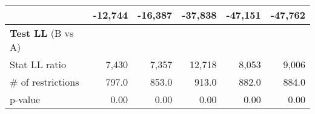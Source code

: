 \begin{tabular}{l|ccccc}
\multicolumn{1}{l}{\hspace{1em}{Model (B)}} &
  \multicolumn{1}{|r}{-12,744} &
  \multicolumn{1}{r}{-16,387} &
  \multicolumn{1}{r}{-37,838} &
  \multicolumn{1}{r}{-47,151} &
  \multicolumn{1}{r}{-47,762} \\ \hline
\multicolumn{1}{l}{\textbf{Test LL} (B vs A)} \\  \hline
\multicolumn{1}{l}{\hspace{1em}Stat LL ratio } &
  \multicolumn{1}{|r}{7,430} &
  \multicolumn{1}{r}{7,357} &
  \multicolumn{1}{r}{12,718} &
  \multicolumn{1}{r}{8,053} &
  \multicolumn{1}{r}{9,006} \\
\multicolumn{1}{l}{\hspace{1em}$\#$ of restrictions } &
  \multicolumn{1}{|r}{797.0} &
  \multicolumn{1}{r}{853.0} &
  \multicolumn{1}{r}{913.0} &
  \multicolumn{1}{r}{882.0} &
  \multicolumn{1}{r}{884.0} \\
\multicolumn{1}{l}{\hspace{1em}p-value } &
  \multicolumn{1}{|r}{0.00} &
  \multicolumn{1}{r}{0.00} &
  \multicolumn{1}{r}{0.00} &
  \multicolumn{1}{r}{0.00} &
  \multicolumn{1}{r}{0.00} \\
\cline{1-6}
\end{tabular}

